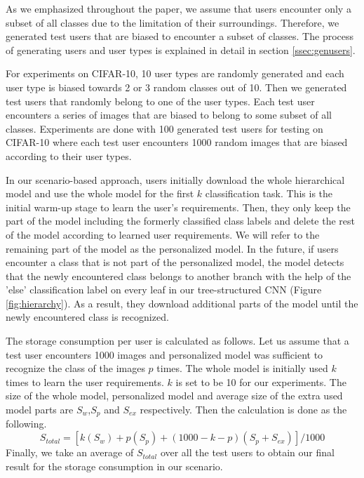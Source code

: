 As we emphasized throughout the paper, we assume that users encounter only a subset of all classes due to the limitation of their surroundings.
Therefore, we generated test users that are biased to encounter a subset of classes. 
The process of generating users and user types is explained in detail in section \ref{ssec:genusers}. 

For experiments on CIFAR-10, 10 user types are randomly generated and each user type is biased towards 2 or 3 random classes out of 10.
Then we generated test users that randomly belong to one of the user types. 
Each test user encounters a series of images that are biased to belong to some subset of all classes. 
Experiments are done with 100 generated test users for testing on CIFAR-10 where each test user encounters 1000 random images that are biased according to their user types.

In our scenario-based approach, users initially download the whole hierarchical model and use the whole model for the first $k$ classification task. 
This is the initial warm-up stage to learn the user's requirements.
Then, they only keep the part of the model including the formerly classified class labels and delete the rest of the model according to learned user requirements.
We will refer to the remaining part of the model as the personalized model.
In the future, if users encounter a class that is not part of the personalized model, the model detects that the newly encountered class belongs to another branch with the help of the 'else' classification label on every leaf in our tree-structured CNN (Figure \ref{fig:hierarchy}). 
As a result, they download additional parts of the model until the newly encountered class is recognized. 

The storage consumption per user is calculated as follows. 
Let us assume that a test user encounters 1000 images and personalized model was sufficient to recognize the class of the images $p$ times. 
The whole model is initially used $k$ times to learn the user requirements. 
$k$ is set to be 10 for our experiments.
The size of the whole model, personalized model and average size of the extra used model parts are $S_w$,$S_p$ and $S_{ex}$ respectively.
Then the calculation is done as the following.
\begin{equation*}
    S_{total} = [k(S_w) + p(S_p) + (1000-k-p)(S_p+S_{ex})] / 1000
\end{equation*}
Finally, we take an average of $S_{total}$ over all the test users to obtain our final result for the storage consumption in our scenario.


